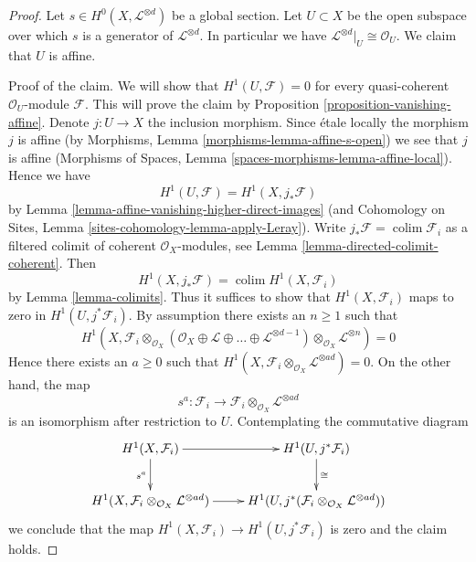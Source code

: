 \documentclass[10pt,a4paper]{amsart}
\theoremstyle{plain}
\theoremstyle{definition}
\theoremstyle{remark}
\numberwithin{equation}{subsection}
\def\colim{\mathop{\mathrm{colim}}\nolimits}
\begin{document}
\begin{proof}
Let $s \in H^0(X, \mathcal{L}^{\otimes d})$ be a global section.
Let $U \subset X$ be the open subspace over which $s$ is a generator
of $\mathcal{L}^{\otimes d}$. In particular we have
$\mathcal{L}^{\otimes d}|_U \cong \mathcal{O}_U$.
We claim that $U$ is affine.

\medskip\noindent
Proof of the claim. We will show that $H^1(U, \mathcal{F}) = 0$
for every quasi-coherent $\mathcal{O}_U$-module $\mathcal{F}$.
This will prove the claim by Proposition \ref{proposition-vanishing-affine}.
Denote $j : U \to X$ the inclusion morphism.
Since \'etale locally the morphism $j$ is affine
(by Morphisms, Lemma \ref{morphisms-lemma-affine-s-open})
we see that $j$ is affine (Morphisms of Spaces, Lemma
\ref{spaces-morphisms-lemma-affine-local}).
Hence we have
$$
H^1(U, \mathcal{F}) = H^1(X, j_*\mathcal{F})
$$
by Lemma \ref{lemma-affine-vanishing-higher-direct-images}
(and Cohomology on Sites, Lemma \ref{sites-cohomology-lemma-apply-Leray}).
Write $j_*\mathcal{F} = \colim \mathcal{F}_i$ as a filtered colimit
of coherent $\mathcal{O}_X$-modules, see
Lemma \ref{lemma-directed-colimit-coherent}. Then
$$
H^1(X, j_*\mathcal{F}) = \colim H^1(X, \mathcal{F}_i)
$$
by Lemma \ref{lemma-colimits}.
Thus it suffices to show that $H^1(X, \mathcal{F}_i)$ maps
to zero in $H^1(U, j^*\mathcal{F}_i)$. By assumption there exists
an $n \geq 1$ such that
$$
H^1(X,
\mathcal{F}_i \otimes_{\mathcal{O}_X}
(\mathcal{O}_X \oplus \mathcal{L} \oplus \ldots
\oplus \mathcal{L}^{\otimes d - 1})
\otimes_{\mathcal{O}_X} \mathcal{L}^{\otimes n}) = 0
$$
Hence there exists an $a \geq 0$ such that
$H^1(X, \mathcal{F}_i \otimes_{\mathcal{O}_X} \mathcal{L}^{\otimes ad}) = 0$.
On the other hand, the map
$$
s^a : \mathcal{F}_i \longrightarrow
\mathcal{F}_i \otimes_{\mathcal{O}_X} \mathcal{L}^{\otimes ad}
$$
is an isomorphism after restriction to $U$. Contemplating the
commutative diagram
$$
\xymatrix{
H^1(X, \mathcal{F}_i) \ar[r] \ar[d]_{s^a} & H^1(U, j^*\mathcal{F}_i)
\ar[d]^{\cong} \\
H^1(X, \mathcal{F}_i \otimes_{\mathcal{O}_X} \mathcal{L}^{\otimes ad}) \ar[r] &
H^1(U,
j^*(\mathcal{F}_i \otimes_{\mathcal{O}_X} \mathcal{L}^{\otimes ad}))
}
$$
we conclude that the map  $H^1(X, \mathcal{F}_i) \to H^1(U, j^*\mathcal{F}_i)$
is zero and the claim holds.


\end{proof}
\end{document}
